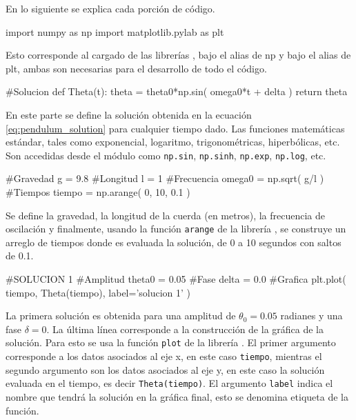 En lo siguiente se explica cada porción de código.


\begin{listing}[style=python, numbers = none]
import numpy as np
import matplotlib.pylab as plt
\end{listing}
Esto corresponde al cargado de las librerías \numpy, bajo el alias de np y
\matplotlib bajo el alias de plt, ambas son necesarias para el desarrollo 
de todo el código.


\begin{listing}[style=python, numbers = none]
#Solucion
def Theta(t):
    theta = theta0*np.sin( omega0*t + delta )
    return theta
\end{listing}
En este parte se define la solución obtenida en la ecuación 
\ref{eq:pendulum_solution} para cualquier tiempo dado. Las funciones 
matemáticas estándar, tales como exponencial, logaritmo, trigonométricas, 
hiperbólicas, etc. Son accedidas desde el módulo \numpy como \texttt{np.sin},
\texttt{np.sinh}, \texttt{np.exp}, \texttt{np.log}, etc.


\begin{listing}[style=python, numbers = none]
#Gravedad
g = 9.8
#Longitud
l = 1
#Frecuencia
omega0 = np.sqrt( g/l )
#Tiempos
tiempo = np.arange( 0, 10, 0.1 )
\end{listing}
Se define la gravedad, la longitud de la cuerda (en metros), la frecuencia
de oscilación y finalmente, usando la función \texttt{arange} de la librería
\numpy, se cons\-truye un arreglo de tiempos donde es evaluada la solución, de 
0 a 10 segundos con saltos de 0.1.


\begin{listing}[style=python, numbers = none]
#SOLUCION 1
#Amplitud
theta0 = 0.05
#Fase
delta = 0.0
#Grafica
plt.plot( tiempo, Theta(tiempo), label='solucion 1' )
\end{listing}
La primera solución es obtenida para una amplitud de $\theta_0 = 0.05$ 
radianes y una fase $\delta = 0$. La última línea corresponde a la 
construcción de la gráfica de la solución. Para esto se usa la función 
\texttt{plot} de la librería \matplotlib. El primer argumento corresponde
a los datos asociados al eje x, en este caso \texttt{tiempo}, mientras el
segundo argumento son los datos asociados al eje y, en este caso la solución
evaluada en el tiempo, es decir \texttt{Theta(tiempo)}. El argumento 
\texttt{label} indica el nombre que tendrá la solución en la gráfica final,
esto se denomina etiqueta de la función.


